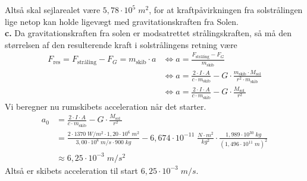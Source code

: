 \documentclass{report}
\begin{document}
Altså skal sejlarealet være $ 5,78 \cdot 10^5\;\unit{m^2} $, for at kraftpåvirkningen fra solstrålingen lige netop kan holde ligevægt med gravitationskraften fra Solen.\\[1ex]
\textbf{c.}
Da gravitationskraften fra solen er modsatrettet strålingskraften, så må den størrelsen af den resulterende kraft i solstrålingens retning være
\begin{equation*}
\begin{split}
  F _{\text{res} }=F _{\text{stråling} }-F_G=m_{\text{skib} } \cdot a &\iff a=\frac{F _{\text{stråling} }-F_G}{m_{\text{skib} }}\\
  &\iff a=\frac{2 \cdot I \cdot A}{c \cdot m_{\text{skib} }}-G \cdot \frac{m_{\text{skib} }\cdot M _{\text{sol} }}{r^2\cdot m_{\text{skib} }}\\
  &\iff a=\frac{2 \cdot I \cdot A}{c \cdot m_{\text{skib} }} - G \cdot \frac{M_{\text{sol }}}{r^2}
\end{split}
\end{equation*}
Vi beregner nu rumskibets acceleration når det starter.
\begin{equation*}
\begin{split}
  a_0&=\frac{2 \cdot I \cdot A}{c \cdot m_{\text{skib} }} - G \cdot \frac{M_{\text{sol }}}{r^2}\\
  &=\frac{2 \cdot 1370 \;\unit{W/m^2} \cdot 1,20 \cdot 10^6 \;\unit{m^2} }{3,00 \cdot 10^8 \;\unit{m/s} \cdot 900 \;\unit{kg} } - 6,674 \cdot 10 ^{-11} \;\unit{\frac{N \cdot m^2}{kg^2}} \cdot \frac{1,989 \cdot 10 ^{30} \;\unit{kg} }{(1,496 \cdot 10 ^{11} \;\unit{m})^2 }\\
  &\approx 6,25 \cdot 10 ^{-3} \;\unit{m/s^2} 
\end{split}
\end{equation*}
Altså er skibets acceleration til start $6,25 \cdot 10 ^{-3} \;\unit{m/s} $.
\end{document}
